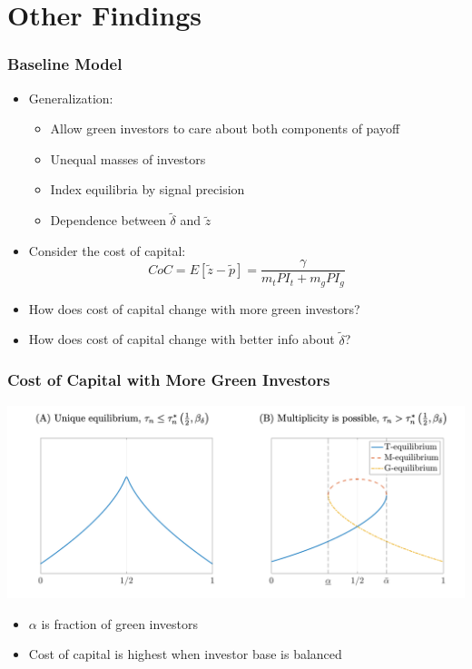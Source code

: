 \documentclass[handout]{beamer}
\begin{document}
\section{Other Findings}

\begin{frame}
\frametitle{Baseline Model}
\begin{itemize}[<+->]
\item Generalization:
\begin{itemize}[<+->]
\item Allow green investors to care about both components of payoff
\item Unequal masses of investors
\item Index equilibria by signal precision
\item Dependence between $\tilde\delta$ and $\tilde z$
\end{itemize}
\bigskip
\item Consider the cost of capital:
$$
CoC = E[\tilde z - \tilde p] = \frac{\gamma}{m_t PI_t + m_g PI_g}
$$
\item How does cost of capital change with more green investors?
\bigskip
\item How does cost of capital change with better info about $\tilde\delta$?
\end{itemize}
\end{frame}


\begin{frame}
\frametitle{Cost of Capital with More Green Investors}
\begin{center}
\includegraphics[scale=0.5]{investor_share}
\end{center}
\begin{itemize}[<+->]
\item $\alpha$ is fraction of green investors
\item Cost of capital is highest when investor base is balanced
\end{itemize}
\end{frame}
\end{document}
